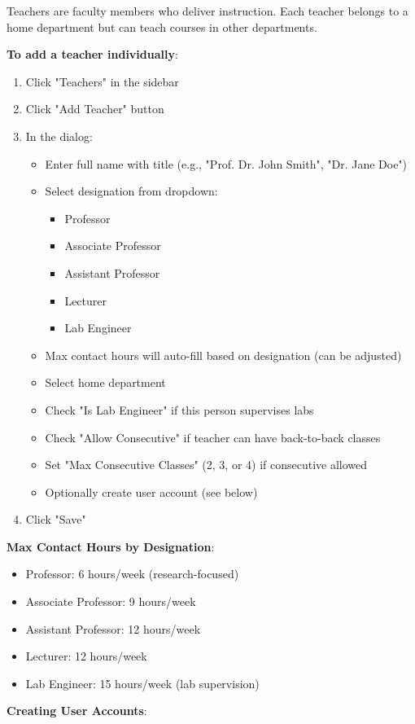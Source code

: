 \documentclass[12pt,a4paper]{article}
\begin{document}
Teachers are faculty members who deliver instruction. Each teacher belongs to a home department but can teach courses in other departments.

\textbf{To add a teacher individually}:
\begin{enumerate}
\item Click "Teachers" in the sidebar
\item Click "Add Teacher" button
\item In the dialog:
\begin{itemize}
\item Enter full name with title (e.g., "Prof. Dr. John Smith", "Dr. Jane Doe")
\item Select designation from dropdown:
\begin{itemize}
\item Professor
\item Associate Professor
\item Assistant Professor
\item Lecturer
\item Lab Engineer
\end{itemize}
\item Max contact hours will auto-fill based on designation (can be adjusted)
\item Select home department
\item Check "Is Lab Engineer" if this person supervises labs
\item Check "Allow Consecutive" if teacher can have back-to-back classes
\item Set "Max Consecutive Classes" (2, 3, or 4) if consecutive allowed
\item Optionally create user account (see below)
\end{itemize}
\item Click "Save"
\end{enumerate}

\textbf{Max Contact Hours by Designation}:
\begin{itemize}
\item Professor: 6 hours/week (research-focused)
\item Associate Professor: 9 hours/week
\item Assistant Professor: 12 hours/week
\item Lecturer: 12 hours/week
\item Lab Engineer: 15 hours/week (lab supervision)
\end{itemize}

\textbf{Creating User Accounts}:
\end{document}
